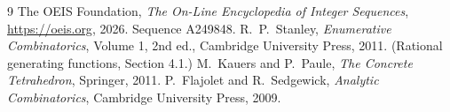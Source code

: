 \documentclass[11pt,a4paper]{article}
\theoremstyle{plain}
\theoremstyle{definition}
\begin{document}
\begin{thebibliography}{9}
 The OEIS Foundation, \emph{The On-Line Encyclopedia of Integer
Sequences}, \url{https://oeis.org}, 2026. Sequence A249848.
 R.~P.~Stanley, \emph{Enumerative Combinatorics}, Volume 1, 2nd ed.,
Cambridge University Press, 2011. (Rational generating functions, Section 4.1.)
 M.~Kauers and P.~Paule, \emph{The Concrete Tetrahedron}, Springer, 2011.
 P.~Flajolet and R.~Sedgewick, \emph{Analytic Combinatorics}, Cambridge
University Press, 2009.
\end{thebibliography}
\end{document}

